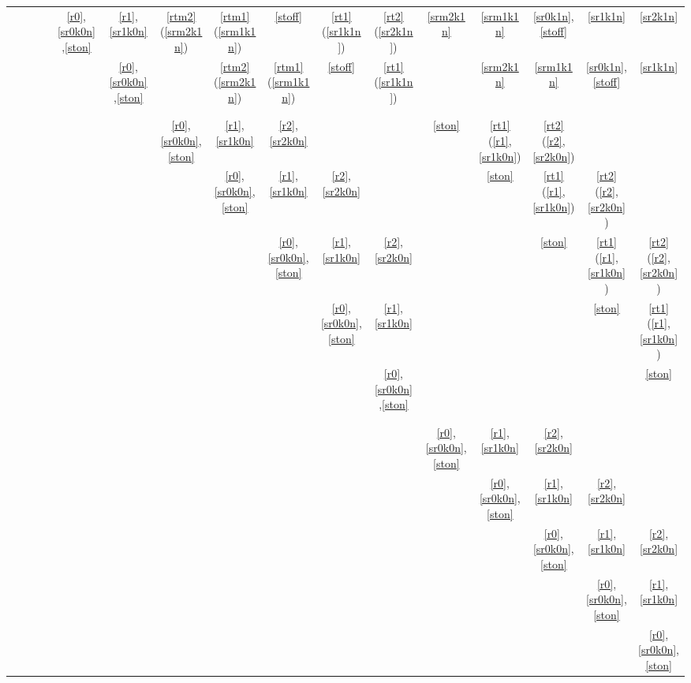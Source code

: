 \documentclass{article}
\begin{document}
\begin{table}[H]
{\begin{tabular}{ccc|ccc||ccccc|ccccc}
&&&& \ref{r0},\ref{sr0k0n},\ref{ston} & \color{red}\color{red}\ref{r1},\ref{sr1k0n} & \color{purple}\ref{rtm2}(\ref{srm2k1n}) & \color{zgreen}\ref{rtm1}(\ref{srm1k1n}) & \ref{stoff} & \color{red}\ref{rt1}(\ref{sr1k1n}) & \color{blue}\ref{rt2}(\ref{sr2k1n}) & \color{purple}\ref{srm2k1n} & \color{zgreen}\ref{srm1k1n} & \ref{sr0k1n},\ref{stoff} & \color{red}\ref{sr1k1n} & \color{blue}\ref{sr2k1n} \\
&&&&& \ref{r0},\ref{sr0k0n},\ref{ston} && \color{purple}\ref{rtm2}(\ref{srm2k1n}) & \color{zgreen}\ref{rtm1}(\ref{srm1k1n}) & \ref{stoff} & \color{red}\ref{rt1}(\ref{sr1k1n}) && \color{purple}\ref{srm2k1n} & \color{zgreen}\ref{srm1k1n} & \ref{sr0k1n},\ref{stoff} & \color{red}\ref{sr1k1n} \\
&&&&&&&&&&&&&&&\\
\hline
\hline
&&&&&&&&&&&&&&&\\
&&&&&& \ref{r0},\ref{sr0k0n},\ref{ston} & \color{red}\ref{r1},\ref{sr1k0n} & \color{blue}\ref{r2},\ref{sr2k0n} &&& \ref{ston} & \color{red}\ref{rt1}(\ref{r1},\ref{sr1k0n}) & \color{blue}\ref{rt2}(\ref{r2},\ref{sr2k0n}) &&\\
&&&&&&& \ref{r0},\ref{sr0k0n},\ref{ston} & \color{red}\ref{r1},\ref{sr1k0n} & \color{blue}\ref{r2},\ref{sr2k0n} &&& \ref{ston} & \color{red}\ref{rt1}(\ref{r1},\ref{sr1k0n}) & \color{blue}\ref{rt2}(\ref{r2},\ref{sr2k0n}) & \\
&&&&&&&& \ref{r0},\ref{sr0k0n},\ref{ston} & \color{red}\ref{r1},\ref{sr1k0n} & \color{blue}\ref{r2},\ref{sr2k0n} &&& \ref{ston} & \color{red}\ref{rt1}(\ref{r1},\ref{sr1k0n}) & \color{blue}\ref{rt2}(\ref{r2},\ref{sr2k0n}) \\
&&&&&&&&& \ref{r0},\ref{sr0k0n},\ref{ston} & \color{red}\ref{r1},\ref{sr1k0n} &&&& \ref{ston} & \color{red}\ref{rt1}(\ref{r1},\ref{sr1k0n}) \\
&&&&&&&&&& \ref{r0},\ref{sr0k0n},\ref{ston} &&&&& \ref{ston} \\
&&&&&&&&&&&&&&&\\
\hline
&&&&&&&&&&&&&&&\\
&&&&&&&&&&& \ref{r0},\ref{sr0k0n},\ref{ston} & \color{red}\ref{r1},\ref{sr1k0n} & \color{blue}\ref{r2},\ref{sr2k0n}&&\\
&&&&&&&&&&&& \ref{r0},\ref{sr0k0n},\ref{ston} & \color{red}\ref{r1},\ref{sr1k0n} & \color{blue}\ref{r2},\ref{sr2k0n} &\\
&&&&&&&&&&&&& \ref{r0},\ref{sr0k0n},\ref{ston} & \color{red}\ref{r1},\ref{sr1k0n} & \color{blue}\ref{r2},\ref{sr2k0n} \\
&&&&&&&&&&&&&& \ref{r0},\ref{sr0k0n},\ref{ston} & \color{red}\ref{r1},\ref{sr1k0n} \\
&&&&&&&&&&&&&&& \ref{r0},\ref{sr0k0n},\ref{ston} \\
\end{tabular}
}
\end{table}
\end{document}
